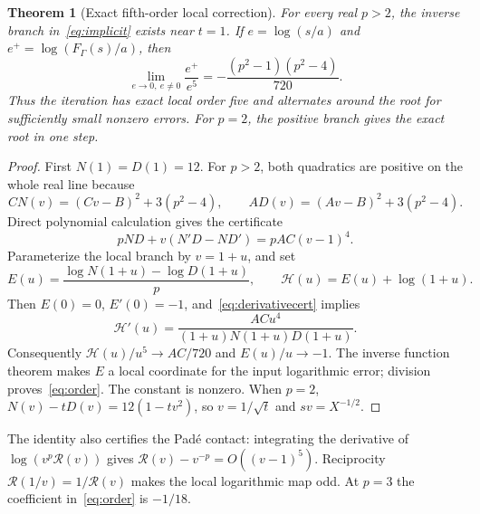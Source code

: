 \documentclass[11pt,a4paper]{article}
\newtheorem{theorem}{Theorem}[section]
\theoremstyle{remark}\newtheorem{remark}[theorem]{Remark}
\begin{document}
\begin{theorem}[Exact fifth-order local correction]\label{thm:order}
For every real $p>2$, the inverse branch in~\eqref{eq:implicit} exists near $t=1$. If $e=\log(s/a)$ and $e^+=\log(F_\Gamma(s)/a)$, then
\begin{equation}\label{eq:order}
 \lim_{e\to0,\ e\ne0}\frac{e^+}{e^5}=-\frac{(p^2-1)(p^2-4)}{720}.
\end{equation}
Thus the iteration has exact local order five and alternates around the root for sufficiently small nonzero errors. For $p=2$, the positive branch gives the exact root in one step.
\end{theorem}
\begin{proof}
First $N(1)=D(1)=12$. For $p>2$, both quadratics are positive on the whole real line because
\[
 CN(v)=(Cv-B)^2+3(p^2-4),\qquad AD(v)=(Av-B)^2+3(p^2-4).
\]
Direct polynomial calculation gives the certificate
\begin{equation}\label{eq:derivativecert}
 pND+v(N'D-ND')=pAC(v-1)^4.
\end{equation}
Parameterize the local branch by $v=1+u$, and set
\[
 E(u)=\frac{\log N(1+u)-\log D(1+u)}p,\qquad
 \mathcal H(u)=E(u)+\log(1+u).
\]
Then $E(0)=0$, $E'(0)=-1$, and~\eqref{eq:derivativecert} implies
\[
 \mathcal H'(u)=\frac{ACu^4}{(1+u)N(1+u)D(1+u)}.
\]
Consequently $\mathcal H(u)/u^5\to AC/720$ and $E(u)/u\to-1$. The inverse function theorem makes $E$ a local coordinate for the input logarithmic error; division proves~\eqref{eq:order}. The constant is nonzero. When $p=2$, $N(v)-tD(v)=12(1-tv^2)$, so $v=1/\sqrt t$ and $sv=X^{-1/2}$.
\end{proof}

The identity also certifies the Pad\'e contact: integrating the derivative of $\log(v^p\mathcal R(v))$ gives $\mathcal R(v)-v^{-p}=O((v-1)^5)$. Reciprocity $\mathcal R(1/v)=1/\mathcal R(v)$ makes the local logarithmic map odd. At $p=3$ the coefficient in~\eqref{eq:order} is $-1/18$.
\end{document}
